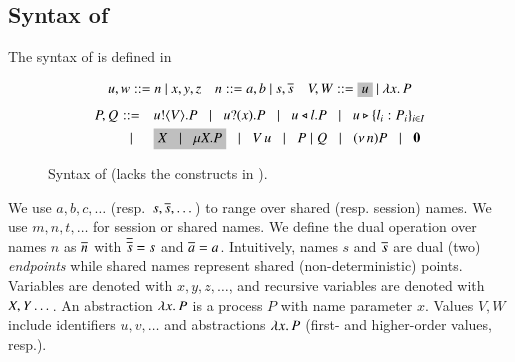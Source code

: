 \subsection{Syntax of \HOp}
\label{subsec:syntax}
	\noindent{} The syntax of \HOp is defined in 
	\begin{figure}[t]
	\[ 
		\begin{array}{lll}
			u,w  ::=  n \ | \ x,y,z
			&
			n ::= a,b  \ | \ s, \dual{s} 
			&
			V,W  ::=   \nonhosyntax{u} \ | \ \abs{x}{P}
		\end{array}
	\]
	\[
		\begin{array}{rclllll}
			P,Q \!\!\!\!\!\!
			& ::= &
			\!\! \bout{u}{V}{P}  \bnfbar  \binp{u}{x}{P} \bnfbar
			\bsel{u}{l} P \bnfbar \bbra{u}{l_i:P_i}_{i \in I}
			\\[1mm]
			& \bnfbar &
			\!\! \nonhosyntax{\rvar{X} \bnfbar \recp{X}{P}} \bnfbar \appl{V}{u} \bnfbar P\Par Q \bnfbar \news{n} P 
			\bnfbar 
			\inact
		\end{array}
	\]
	\caption{Syntax of \HOp (\HO lacks the constructs in ).}
	\label{fig:syntax}
	\Hlinefig
\end{figure}
We use $a,b,c, \dots$ (resp.~$s, \overline{s}, \dots$) 
to range over shared (resp. session) names. 
We use $m, n, t, \dots$ for session or shared names. 
We define the dual operation over names $n$ as $\overline{n}$ with
$\overline{\overline{s}} = s$ and $\overline{a} = a$.
Intuitively, names $s$ and $\overline{s}$ are dual (two) \emph{endpoints} while 
shared names represent shared (non-deterministic) points. 
Variables are denoted with $x, y, z, \dots$, 
and recursive variables are denoted with $X, Y \dots$.
An abstraction %
$\lambda x.\,P$ is a process $P$ with name parameter $x$.
Values $V,W$ include 
identifiers $u, v, \ldots$ %
and 
abstractions $\lambda x.\,P$ (first- and higher-order values, resp.). 

